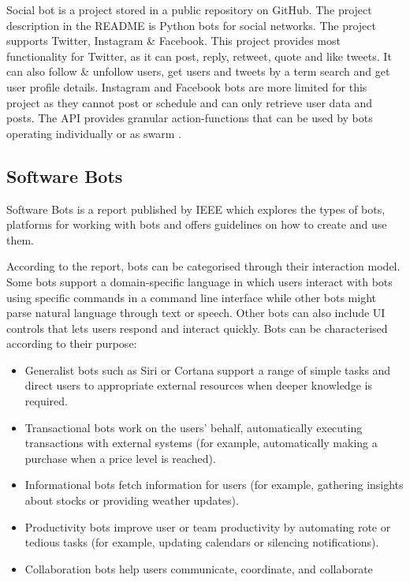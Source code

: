 \documentclass[chapterprefix=false]{scrreprt}
\begin{document}
Social bot is a project stored in a public repository on GitHub. The project description in the README is Python bots for social networks. The project supports Twitter, Instagram \& Facebook. This project provides most functionality for Twitter, as it can post, reply, retweet, quote and like tweets. It can also follow \& unfollow users, get users and tweets by a term search and get user profile details. Instagram and Facebook bots are more limited for this project as they cannot post or schedule and can only retrieve user data and posts. The API provides granular action-functions that can be used by bots operating individually or as swarm \cite{socialbot}.

\subsection{Software Bots}

Software Bots is a report published by IEEE which explores the types of bots, platforms for working with bots and offers guidelines on how to create and use them. 

According to the report, bots can be categorised through their interaction model. Some bots support a domain-specific language in which users interact with bots using specific commands in a command line interface while other bots might parse natural language through text or speech. Other bots can also include UI controls that lets users respond and interact quickly. Bots can be characterised according to their purpose:

\begin{itemize}
 \setlength\itemsep{-0.75em}
 \item Generalist bots such as Siri or Cortana support a range of simple tasks and direct users to appropriate external resources when deeper knowledge is required. 
 \item Transactional bots work on the users’ behalf, automatically executing transactions with external systems (for example, automatically making a purchase when a price level is reached).
 \item Informational bots fetch information for users (for example, gathering insights about stocks or providing weather updates).
 \item Productivity bots improve user or team productivity by automating rote or tedious tasks (for example, updating calendars or silencing notifications).
 \item Collaboration bots help users communicate, coordinate, and collaborate
\end{itemize}
\end{document}
